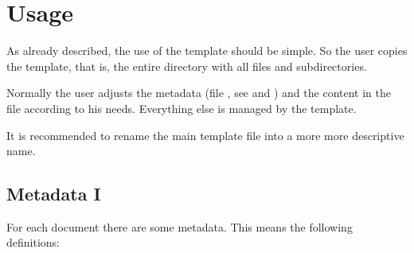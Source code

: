 \section{Usage}

As already described, the use of the template should be simple. So the user
copies the template, that is, the entire directory with all files and
subdirectories.
\bigbreak

Normally the user adjusts the metadata (file ,
see  and ) and the
content in the file  according to his
needs. Everything else is managed by the template.
\bigbreak

It is recommended to rename the main template file 
into a more more descriptive name.


\subsection{Metadata I}\label{subsec:Metadata-I}

For each document there are some metadata. This means the following definitions:

